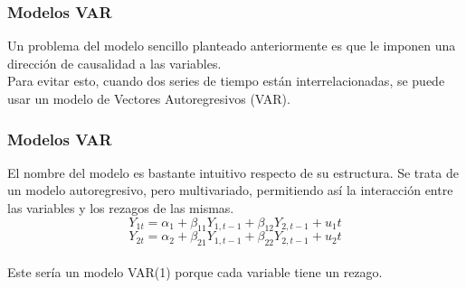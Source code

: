 \documentclass{beamer}
\begin{document}
\begin{frame}
\frametitle{Modelos VAR}
Un problema del modelo sencillo planteado anteriormente es que le imponen una dirección de causalidad a las variables.\\ 
\vspace{5mm} %
Para evitar esto, cuando dos series de tiempo están interrelacionadas, se puede usar un modelo de Vectores Autoregresivos (VAR).\\
\end{frame}

\begin{frame}
\frametitle{Modelos VAR}
El nombre del modelo es bastante intuitivo respecto de su estructura. Se trata de un modelo autoregresivo, pero multivariado, permitiendo así la interacción entre las variables y los rezagos de las mismas.\\ 
\vspace{5mm} %
\[
Y_{1t}=\alpha_1+\beta_{11}Y_{1,t-1}+\beta_{12}Y_{2,t-1}+u_1t
\]
\[
Y_{2t}=\alpha_2+\beta_{21}Y_{1,t-1}+\beta_{22}Y_{2,t-1}+u_2t
\]
\\
\vspace{5mm} %
Este sería un modelo VAR(1) porque cada variable tiene un rezago. 

\end{frame}
\end{document}
